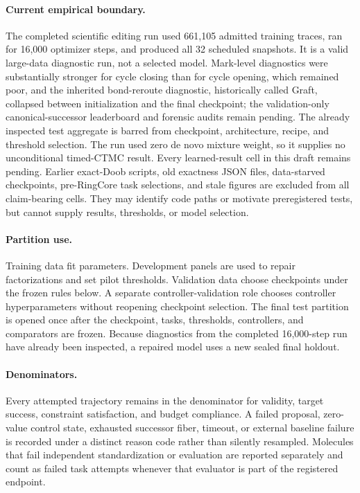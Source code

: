 \paragraph{Current empirical boundary.}
The completed scientific editing run used 661,105 admitted training traces,
ran for 16,000 optimizer steps, and produced all 32 scheduled snapshots. It is
a valid large-data diagnostic run, not a selected model. Mark-level diagnostics
were substantially stronger for cycle closing than for cycle opening, which
remained poor, and the inherited bond-reroute diagnostic, historically called
Graft, collapsed between initialization and the final checkpoint; the
validation-only canonical-successor leaderboard and forensic
audits remain pending. The already inspected test aggregate is barred from
checkpoint, architecture, recipe, and threshold selection. The run used zero
de novo mixture weight, so it supplies no unconditional timed-CTMC result.
Every learned-result cell in this draft remains pending.
Earlier exact-Doob scripts, old exactness JSON files, data-starved checkpoints,
pre-RingCore task selections, and stale figures are excluded from all
claim-bearing cells. They may identify code paths or motivate preregistered
tests, but cannot supply results, thresholds, or model selection.

\paragraph{Partition use.}
Training data fit parameters.  Development panels are used to repair
factorizations and set pilot thresholds. Validation data choose checkpoints
under the frozen rules below. A separate controller-validation role chooses
controller hyperparameters without reopening checkpoint selection. The final
test partition is opened once after the checkpoint, tasks, thresholds,
controllers, and comparators are frozen. Because diagnostics from the
completed 16,000-step run have already been inspected, a repaired model uses a
new sealed final holdout.

\paragraph{Denominators.}
Every attempted trajectory remains in the denominator for validity, target
success, constraint satisfaction, and budget compliance.  A failed proposal,
zero-value control state, exhausted successor fiber, timeout, or external
baseline failure is recorded under a distinct reason code rather than silently
resampled.  Molecules that fail independent standardization or evaluation are
reported separately and count as failed task attempts whenever that evaluator
is part of the registered endpoint.

